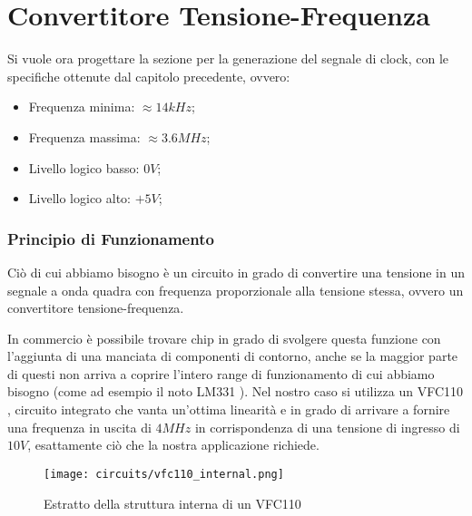 \chapter{Convertitore Tensione-Frequenza}


Si vuole ora progettare la sezione per la generazione del segnale di clock, con le specifiche
ottenute dal capitolo precedente, ovvero:

\begin{itemize}
    \item Frequenza minima: $\approx 14kHz$;
    \item Frequenza massima: $\approx 3.6MHz$;
    \item Livello logico basso: $0V$;
    \item Livello logico alto: $+5V$;
\end{itemize}


\subsection*{Principio di Funzionamento}


Ciò di cui abbiamo bisogno è un circuito in grado di convertire una tensione in un segnale
a onda quadra con frequenza proporzionale alla tensione stessa, ovvero un convertitore
tensione-frequenza.

In commercio è possibile trovare chip in grado di svolgere questa funzione con l'aggiunta
di una manciata di componenti di contorno, anche se la maggior parte di questi non
arriva a coprire l'intero range di funzionamento di cui abbiamo bisogno (come ad esempio
il noto LM331 \cite{lm331}). Nel nostro caso si utilizza un VFC110 \cite{vfc110},
circuito integrato che vanta un'ottima linearità e in grado di arrivare a fornire una
frequenza in uscita di $4MHz$ in corrispondenza di una tensione di ingresso di $10V$,
esattamente ciò che la nostra applicazione richiede.
\medskip

\begin{figure}[ht]
    \centering
    \texttt{[image: circuits/vfc110\_internal.png]}
    \caption{Estratto della struttura interna di un VFC110}
    \label{vfc100_internal}
\end{figure}


